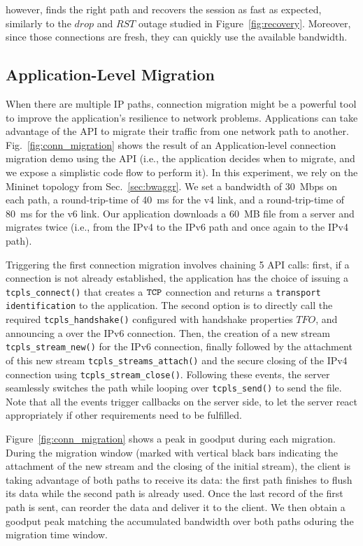\tcpls however, finds the right path and recovers the session as fast as
expected, similarly to the $drop$ and $RST$ outage studied in Figure~\ref{fig:recovery}.
Moreover, since those connections are fresh, they can quickly use the available bandwidth.

\subsection{Application-Level Migration}

When there are multiple IP paths, connection migration might be a
powerful tool to improve the application's resilience to network problems. Applications
can take advantage of the \tcpls API to migrate their traffic from one network
path to another.
Fig.~\ref{fig:conn_migration} shows the result of an Application-level
connection migration demo using the API (i.e., the application
decides when to migrate, and we expose a simplistic code flow to perform it).
In this experiment, we rely on the Mininet topology from Sec.~\ref{sec:bwaggr}.
We set a
bandwidth of 30~Mbps on each path, a round-trip-time of 40~ms for the v4 link,
and a round-trip-time of 80~ms for the v6 link. Our application downloads
a 60~MB file from a server and migrates twice (i.e., from the IPv4 to the IPv6 path
and once again to the IPv4 path).

Triggering the first connection migration involves chaining 5 API calls: first,
if a \tcp connection is not already established, the application has the choice 
of issuing a \texttt{tcpls\_connect()} that creates a $\texttt{TCP}$ connection and
returns a \texttt{transport identification} to the application. The second option
is to  directly call the required \texttt{tcpls\_handshake()} configured with handshake properties $TFO$,
and announcing a \join over the IPv6 connection. Then, the creation of a new stream
\texttt{tcpls\_stream\_new()} for the IPv6 connection, finally followed by the
attachment of this new stream \texttt{tcpls\_streams\_attach()} and the secure
closing of the IPv4 \tcp connection using \texttt{tcpls\_stream\_close()}.
Following these events, the server seamlessly switches the path while looping
over \texttt{tcpls\_send()} to send the file. Note that all the events
trigger callbacks on the server side, to let the server react appropriately if
other requirements need to be fulfilled.

Figure~\ref{fig:conn_migration} shows a peak in goodput during each
migration. During the migration window (marked with vertical black bars
indicating the attachment of the new stream and the closing of the initial
stream), the client is taking advantage of both paths to receive its data: the
first path finishes to flush its data while the second path is already used.
Once the last record of the first path is sent, \tcpls can reorder the
data and deliver it to the client. We then obtain a goodput peak matching the
accumulated bandwidth over both paths oduring the migration time window.

